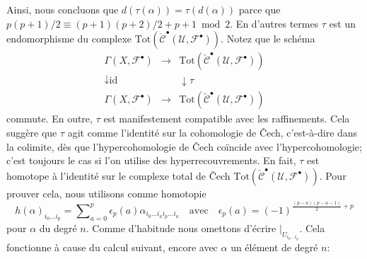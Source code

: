 Ainsi, nous concluons que $d(\tau(\alpha)) = \tau(d(\alpha))$
parce que $p(p + 1)/2 \equiv (p + 1)(p + 2)/2 + p + 1 \bmod 2$. En d'autres termes
$\tau$ est un endomorphisme du complexe
$\text{Tot}(\check{\mathcal{C}}^\bullet({\mathcal U}, {\mathcal F}^\bullet))$. Notez que le schéma
$$
\begin{matrix}
\Gamma(X, {\mathcal F}^\bullet) &
\longrightarrow &
\text{Tot}(\check{\mathcal{C}}^\bullet({\mathcal U}, {\mathcal F}^\bullet)) \\
\downarrow \text{id} & & \downarrow \tau \\
\Gamma(X, {\mathcal F}^\bullet) &
\longrightarrow &
\text{Tot}(\check{\mathcal{C}}^\bullet({\mathcal U}, {\mathcal F}^\bullet))
\end{matrix}
$$
commute. En outre, $\tau$ est manifestement compatible avec les raffinements. Cela suggère que $\tau$ agit comme l'identité sur la cohomologie de {\v C}ech, c'est-à-dire dans la colimite, dès que l'hypercohomologie de {\v C}ech coïncide avec l'hypercohomologie; c'est toujours le cas si l'on utilise des hyperrecouvrements. En fait, $\tau$ est homotope à l'identité sur le complexe total de {\v C}ech
$\text{Tot}(\check{\mathcal{C}}^\bullet({\mathcal U}, {\mathcal F}^\bullet))$. Pour prouver cela, nous utilisons comme homotopie
$$
h(\alpha)_{i_0 \ldots i_p}
=
\sum\nolimits_{a = 0}^p
\epsilon_p(a)
\alpha_{i_0 \ldots i_a i_p \ldots i_a}
\quad\text{avec}\quad
\epsilon_p(a) = (-1)^{\frac{(p - a)(p - a - 1)}{2} + p}
$$
pour $\alpha$ du degré $n$. Comme d'habitude nous omettons d'écrire
$|_{U_{i_0 \ldots i_p}}$. Cela fonctionne à cause du calcul suivant, encore avec
$\alpha$ un élément de degré $n$:


